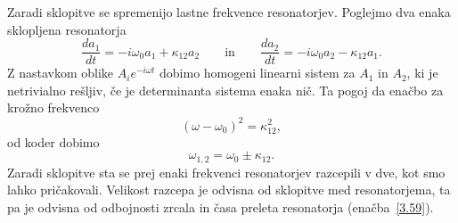 Zaradi sklopitve se spremenijo lastne frekvence resonatorjev. 
Poglejmo dva enaka sklopljena resonatorja
\begin{equation}
\frac{da_1}{dt}  =  -i\omega_{0}a_{1}+\kappa_{12}a_{2} \qquad \mathrm{in} \qquad 
\frac{da_2}{dt} =  -i\omega_{0}a_{2}-\kappa_{12}a_{1}.
\end{equation}
Z nastavkom oblike $A_{i}e^{-i\omega t}$ dobimo homogeni linearni sistem za $A_{1}$ in
$A_{2}$, ki je netrivialno rešljiv, če je determinanta sistema enaka nič.
Ta pogoj da enačbo za krožno frekvenco
\begin{equation}
(\omega-\omega_{0})^{2}=\kappa_{12}^{2}\label{3.61},
\end{equation}
od koder dobimo
\begin{equation}
\omega_{1,2}=\omega_{0}\pm\kappa_{12}.\label{3.62}
\end{equation}
Zaradi sklopitve sta se prej enaki frekvenci resonatorjev razcepili v dve, kot
smo lahko pričakovali. Velikost razcepa je odvisna od sklopitve med resonatorjema, ta
pa je odvisna od odbojnosti zrcala in časa
preleta resonatorja (enačba~\ref{3.59}).
